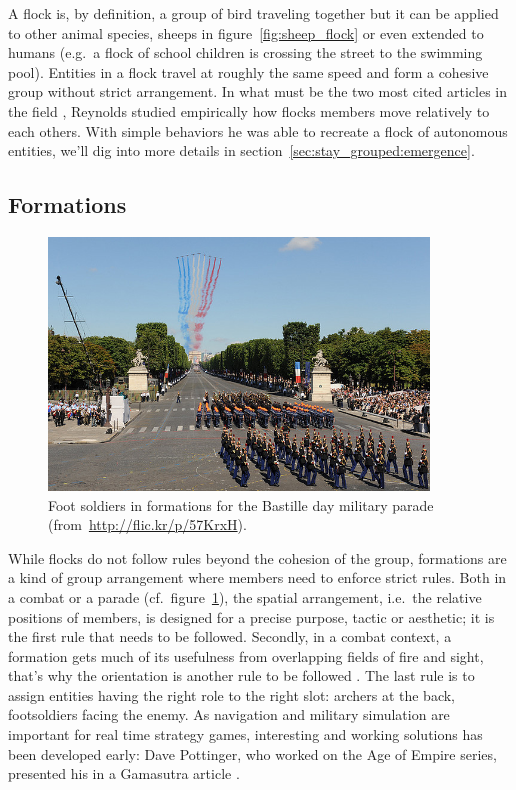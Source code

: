\documentclass[a4paper,titlepage]{article}
\begin{document}
A flock is, by definition, a group of bird traveling together but it can be applied to other animal species, sheeps in figure~\ref{fig:sheep_flock} or even extended to humans (e.g.\ a flock of school children is crossing the street to the swimming pool). Entities in a flock travel at roughly the same speed and form a cohesive group without strict arrangement. In what must be the two most cited articles in the field \cite{Reynolds:1987vm,Reynolds:1999vr}, Reynolds studied empirically how flocks members move relatively to each others. With simple behaviors he was able to recreate a flock of autonomous entities, we’ll dig into more details in section~\ref{sec:stay_grouped:emergence}.

\subsection{Formations}
\label{sec:taxonomy:formations}

\begin{figure}[h]
\centering
\includegraphics[width=0.9\textwidth]{BastilleDay.jpg}
\caption{Foot soldiers in formations for the Bastille day military parade (from~\url{http://flic.kr/p/57KrxH}).}
\label{fig:bastille_day}
\end{figure}

While flocks do not follow rules beyond the cohesion of the group, formations are a kind of group arrangement where members need to enforce strict rules. Both in a combat or a parade (cf.\ figure~\ref{fig:bastille_day}), the spatial arrangement, i.e.\ the relative positions of members, is designed for a precise purpose, tactic or aesthetic; it is the first rule that needs to be followed. Secondly, in a combat context, a formation gets much of its usefulness from overlapping fields of fire and sight, that’s why the orientation is another rule to be followed \cite{Dawson:2002vd}. The last rule is to assign entities having the right role to the right slot: archers at the back, footsoldiers facing the enemy. As navigation and military simulation are important for real time strategy games, interesting and working solutions has been developed early: Dave Pottinger, who worked on the Age of Empire series, presented his in a Gamasutra article \cite{Pottinger:1999vk}.
\end{document}
